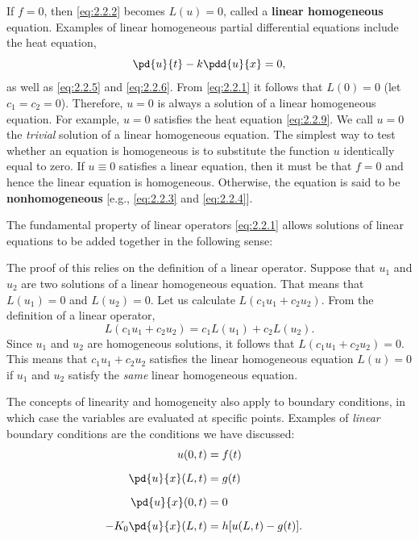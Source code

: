 If $f = 0$, then \eqref{eq:2.2.2} becomes $L(u) = 0$, called a \textbf{linear homogeneous} equation. Examples of linear homogeneous partial differential equations include the heat equation,
\begin{equation}
\label{eq:2.2.9}
\pd{u}{t} - k\pdd{u}{x} = 0,
\end{equation}
as well as \eqref{eq:2.2.5} and \eqref{eq:2.2.6}. From \eqref{eq:2.2.1} it follows that $L(0) = 0$ (let $c_1 = c_2 = 0$). Therefore, $u = 0$ is always a solution of a linear homogeneous equation. For example, $u = 0$ satisfies the heat equation \eqref{eq:2.2.9}. We call $u = 0$ the \emph{trivial} solution of a linear homogeneous equation. The simplest way to test whether an equation is homogeneous is to substitute the function $u$ identically equal to zero. If $u \equiv 0$ satisfies a linear equation, then it must be that $f = 0$ and hence the linear equation is homogeneous. Otherwise, the equation is said to be \textbf{nonhomogeneous} [e.g., \eqref{eq:2.2.3} and \eqref{eq:2.2.4}].

The fundamental property of linear operators \eqref{eq:2.2.1} allows solutions of linear equations to be added together in the following sense:

\begin{center}
\end{center}

The proof of this relies on the definition of a linear operator. Suppose that $u_1$ and $u_2$ are two solutions of a linear homogeneous equation. That means that $L(u_1) = 0$ and $L(u_2) = 0$. Let us calculate $L(c_1 u_1 + c_2 u_2)$. From the definition of a linear operator,
\[
L(c_1 u_1 + c_2 u_2) = c_1 L(u_1) + c_2 L(u_2).
\]
Since $u_1$ and $u_2$ are homogeneous solutions, it follows that $L(c_1 u_1 + c_2 u_2) = 0$. This means that $c_1 u_1 + c_2 u_2$ satisfies the linear homogeneous equation $L(u) = 0$ if $u_1$ and $u_2$ satisfy the \emph{same} linear homogeneous equation.

The concepts of linearity and homogeneity also apply to boundary conditions, in which case the variables are evaluated at specific points. Examples of \emph{linear} boundary conditions are the conditions we have discussed:
\begin{alignat}{2}
u(0,t) &= f(t) & \label{eq:2.2.10} \\[6pt]
\pd{u}{x}(L,t) &= g(t) & \label{eq:2.2.11} \\[6pt]
\pd{u}{x}(0,t) &= 0 & \label{eq:2.2.12} \\[6pt]
-K_0 \pd{u}{x}(L,t) &= h[u(L,t) - g(t)]. & \label{eq:2.2.13}
\end{alignat}

